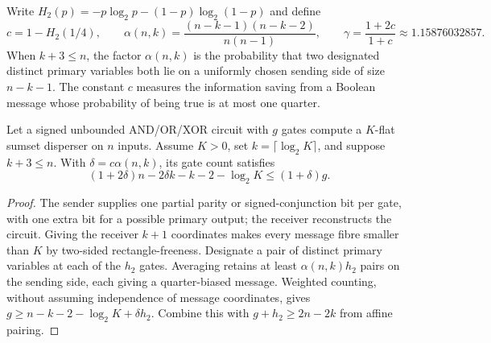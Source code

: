 \begin{definition}
  \label{def:lowerbounds-algebraic-geometry-coefficient}
  \leanok
  Write $H_2(p)=-p\log_2p-(1-p)\log_2(1-p)$ and define
  \[
    c=1-H_2(1/4),\qquad
    \alpha(n,k)=\frac{(n-k-1)(n-k-2)}{n(n-1)},\qquad
    \gamma=\frac{1+2c}{1+c}\approx1.15876032857.
  \]
  When $k+3\le n$, the factor $\alpha(n,k)$ is the probability that two designated
  distinct primary variables both lie on a uniformly chosen sending side of
  size $n-k-1$. The constant $c$ measures the information saving from a Boolean
  message whose probability of being true is at most one quarter.
\end{definition}

\begin{theorem}
  \label{thm:lowerbounds-algebraic-geometry-finite}
  \leanok
  Let a signed unbounded AND/OR/XOR circuit with $g$ gates compute a
  $K$-flat sumset disperser on $n$ inputs. Assume $K>0$, set
  $k=\lceil\log_2K\rceil$, and suppose $k+3\le n$. With
  $\delta=c\alpha(n,k)$, its gate count satisfies
  \[
    (1+2\delta)n-2\delta k-k-2-\log_2K\le(1+\delta)g.
  \]
\end{theorem}
\begin{proof}
  \leanok
  The sender supplies one partial parity or signed-conjunction bit per gate,
  with one extra bit for a possible primary output; the receiver reconstructs
  the circuit. Giving the receiver $k+1$ coordinates makes every message fibre
  smaller than $K$ by two-sided rectangle-freeness. Designate a pair of distinct
  primary variables at each of the $h_2$ gates. Averaging retains at least
  $\alpha(n,k)h_2$ pairs on the sending side, each giving a quarter-biased message.
  Weighted counting, without assuming independence of message coordinates, gives
  $g\ge n-k-2-\log_2K+\delta h_2$. Combine this with
  $g+h_2\ge2n-2k$ from affine pairing.
\end{proof}

